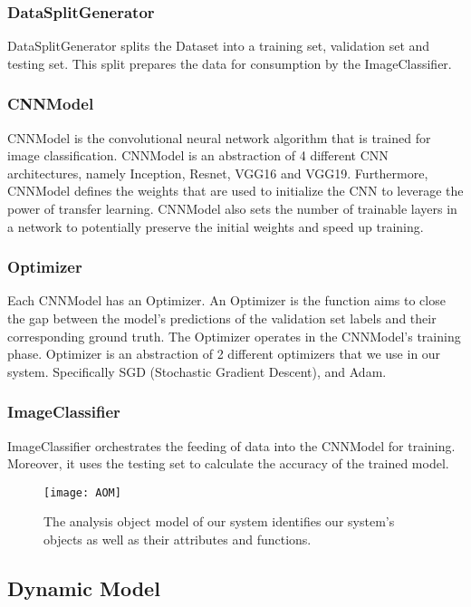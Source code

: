 \subsubsection{DataSplitGenerator}
DataSplitGenerator splits the Dataset into a training set, validation set and testing set. This split prepares the data for consumption by the ImageClassifier.

\subsubsection{CNNModel}
CNNModel is the convolutional neural network algorithm that is trained for image classification. CNNModel is an abstraction of 4 different CNN architectures, namely Inception, Resnet, VGG16 and VGG19. Furthermore, CNNModel defines the weights that are used to initialize the CNN to leverage the power of transfer learning. CNNModel also sets the number of trainable layers in a network to potentially preserve the initial weights and speed up training.

\subsubsection{Optimizer}
Each CNNModel has an Optimizer. An Optimizer is the function aims to close the gap between the model's predictions of the validation set labels and their corresponding ground truth. The Optimizer operates in the CNNModel's training phase. Optimizer is an abstraction of 2 different optimizers that we use in our system. Specifically SGD (Stochastic Gradient Descent), and Adam.

\subsubsection{ImageClassifier}
ImageClassifier orchestrates the feeding of data into the CNNModel for training. Moreover, it uses the testing set to calculate the accuracy of the trained model.

\begin{figure}[H]
\centering
  \texttt{[image: AOM]}
\caption{The analysis object model of our system identifies our system's objects as well as their attributes and functions.}
\label{fig:AOM}
\end{figure}

\subsection{Dynamic Model}

